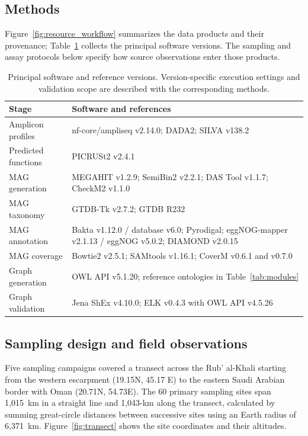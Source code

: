 \begin{revision}

\section{Methods}\label{methods}

Figure~\ref{fig:resource_workflow} summarizes the data products and their provenance; Table~\ref{tab:software_versions} collects the principal software versions. The sampling and assay protocols below specify how source observations enter those products.

\begin{table}[ht]
\centering\small
\caption{Principal software and reference versions. Version-specific execution settings and validation scope are described with the corresponding methods.}
\label{tab:software_versions}
\begin{tabular}{p{}p{}}
\toprule
Stage & Software and references \\
\midrule
Amplicon profiles & nf-core/ampliseq v2.14.0; DADA2; SILVA v138.2 \\
Predicted functions & PICRUSt2 v2.4.1 \\
MAG generation & MEGAHIT v1.2.9; SemiBin2 v2.2.1; DAS Tool v1.1.7; CheckM2 v1.1.0 \\
MAG taxonomy & GTDB-Tk v2.7.2; GTDB R232 \\
MAG annotation & Bakta v1.12.0 / database v6.0; Pyrodigal; eggNOG-mapper v2.1.13 / eggNOG v5.0.2; DIAMOND v2.0.15 \\
MAG coverage & Bowtie2 v2.5.1; SAMtools v1.16.1; CoverM v0.6.1 and v0.7.0 \\
Graph generation & OWL API v5.1.20; reference ontologies in Table~\ref{tab:modules} \\
Graph validation & Jena ShEx v4.10.0; ELK v0.4.3 with OWL API v4.5.26 \\
\bottomrule
\end{tabular}
\end{table}



\subsection{Sampling design and field observations}

Five sampling campaigns covered a transect across the Rub' al-Khali starting from the western escarpment (19.15\degree N, 45.17\degree
E) to the eastern Saudi Arabian border with Oman (20.71\degree N,
54.73\degree E). The 60 primary sampling sites span 1,015~km in a straight line and 1,043-km along the transect, calculated by summing great-circle distances between successive sites using an Earth radius of 6,371~km.
Figure~\ref{fig:transect} shows the site coordinates and their altitudes.


\end{revision}
